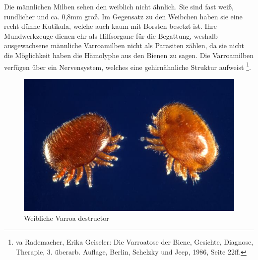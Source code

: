 \documentclass[11pt,a4paper]{article}
\begin{document}
Die männlichen Milben sehen den weiblich nicht ähnlich. Sie sind fast weiß, rundlicher und ca. 0,8mm groß. Im Gegensatz zu den Weibchen haben sie eine recht dünne Kutikula, welche auch kaum mit Borsten besetzt ist. Ihre Mundwerkzeuge dienen ehr als Hilfsorgane für die Begattung, weshalb ausgewachsene männliche Varroamilben nicht als Parasiten zählen, da sie nicht die Möglichkeit haben die Hämolyphe aus den Bienen zu sagen.
Die Varroamilben verfügen über ein Nervensystem, welches eine gehirnähnliche Struktur aufweist \footnote{va Rademacher, Erika Geiseler: Die Varroatose der Biene, Gesichte, Diagnose, Therapie, 3. überarb. Auflage, Berlin, Schelzky und Jeep, 1986, Seite 22ff.}. 
\begin{figure}[H]
    \centering
    \includegraphics[width = .7\textwidth]{images/Varroamilbe.jpg}
    \caption{Weibliche Varroa destructor}
    \label{fig:annotated_edited}
\end{figure}

    
    
    
\end{document}
